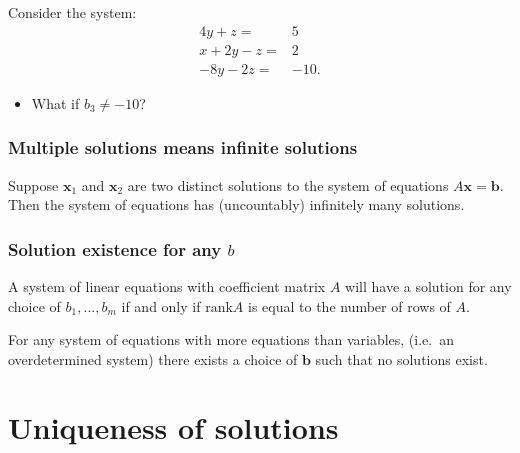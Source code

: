 \documentclass[compress]{beamer}
\newcommand{\rank}{\mathrm{rank}}
\theoremstyle{definition}
\begin{document}
\begin{frame}
  Consider the system:
  \begin{align*}
    4 y + z = & 5 \\    
    x + 2 y - z = & 2 \\
    -8y - 2z = & -10.
  \end{align*}
  \begin{itemize}
  \item What if $b_3 \neq -10$?
  \end{itemize}  
\end{frame}



\begin{frame}\frametitle{Multiple solutions means infinite solutions}
  \begin{lemma}\label{lem:sinf}
    Suppose $\mathbf{x}_1$ and $\mathbf{x}_2$ are two distinct
    solutions to the system of equations $A \mathbf{x} =
    \mathbf{b}$. Then the system of equations has (uncountably)
    infinitely many solutions.
  \end{lemma}
\end{frame}

\begin{frame}\frametitle{Solution existence for any $b$}
  \begin{theorem}\label{thm:sexist}
    A system of linear equations with coefficient matrix $A$ will have a
    solution for any choice of $b_1, ..., b_m$ if and only if $\rank A$
    is equal to the number of rows of $A$.
  \end{theorem}

  \begin{corollary}
    For any system of equations with more equations than variables,
    (i.e.\ an overdetermined system)
    there exists a choice of $\textbf{b}$ such that no solutions exist. 
  \end{corollary}
\end{frame}

\section{Uniqueness of solutions}
\end{document}
